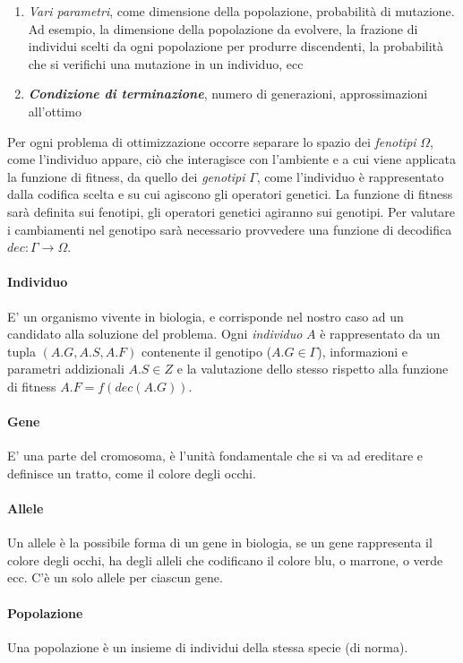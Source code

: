 \begin{enumerate}
    \item \textit{Vari parametri}, come dimensione della popolazione, probabilità di mutazione. Ad esempio, la dimensione della popolazione da evolvere, la frazione di individui scelti da ogni popolazione per produrre discendenti, la probabilità che si verifichi una mutazione in un individuo, ecc
    \item \textbf{\textit{Condizione di terminazione}}, numero di generazioni, approssimazioni all'ottimo
\end{enumerate}

Per ogni problema di ottimizzazione occorre separare lo spazio dei \textit{fenotipi} $\Omega$, come l'individuo appare, ciò che interagisce con l’ambiente e a cui viene applicata la funzione di fitness, da quello dei \textit{genotipi} $\Gamma$, come l'individuo è rappresentato dalla codifica scelta e su cui agiscono gli operatori genetici. La funzione di fitness sarà definita sui fenotipi, gli operatori genetici agiranno sui genotipi. Per valutare i cambiamenti nel genotipo sarà necessario provvedere una funzione di decodifica $dec: \Gamma \to \Omega$.

\paragraph{Individuo}
E' un organismo vivente in biologia, e corrisponde nel nostro caso ad un candidato alla soluzione del problema. Ogni \textit{individuo} $A$ è rappresentato da un tupla $(A.G, A.S, A.F)$ contenente il genotipo ($A.G \in \Gamma$), informazioni e parametri addizionali $A.S \in Z$ e la valutazione dello stesso rispetto alla funzione di fitness $A.F = f(dec(A.G))$.

\paragraph{Gene}
E' una parte del cromosoma, è l’unità fondamentale che si va ad ereditare e definisce un tratto, come il colore degli occhi.

\paragraph{Allele}
Un allele è la possibile forma di un gene in biologia, se un gene rappresenta il colore degli occhi, ha degli alleli che codificano il colore blu, o marrone, o verde ecc. C’è un solo allele per ciascun gene.

\paragraph{Popolazione}
Una popolazione è un insieme di individui della stessa specie (di norma).

